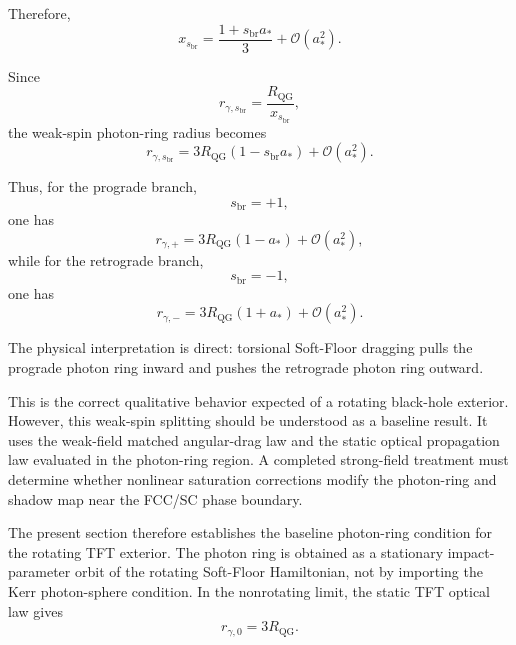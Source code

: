 Therefore,
\begin{equation}
    x_{s_{\mathrm{br}}} = \frac{1+s_{\mathrm{br}} a_\ast}{3} + \mathcal{O}(a_\ast^2).
\end{equation}

Since
\begin{equation}
    r_{\gamma,s_{\mathrm{br}}} = \frac{R_{\mathrm{QG}}}{x_{s_{\mathrm{br}}}},
\end{equation}
the weak-spin photon-ring radius becomes
\begin{equation}
    \boxed{ r_{\gamma,s_{\mathrm{br}}} = 3R_{\mathrm{QG}} \left( 1-s_{\mathrm{br}} a_\ast \right) + \mathcal{O}(a_\ast^2). }
\end{equation}

Thus, for the prograde branch,
\begin{equation}
    s_{\mathrm{br}} = +1,
\end{equation}
one has
\begin{equation}
    \boxed{ r_{\gamma,+} = 3R_{\mathrm{QG}} (1-a_\ast) + \mathcal{O}(a_\ast^2), }
\end{equation}
while for the retrograde branch,
\begin{equation}
    s_{\mathrm{br}} = -1,
\end{equation}
one has
\begin{equation}
    \boxed{ r_{\gamma,-} = 3R_{\mathrm{QG}} (1+a_\ast) + \mathcal{O}(a_\ast^2). }
\end{equation}

The physical interpretation is direct: torsional Soft-Floor dragging pulls the prograde photon ring inward and pushes the retrograde photon ring outward.

This is the correct qualitative behavior expected of a rotating black-hole exterior. However, this weak-spin splitting should be understood as a baseline result. It uses the weak-field matched angular-drag law and the static optical propagation law evaluated in the photon-ring region. A completed strong-field treatment must determine whether nonlinear saturation corrections modify the photon-ring and shadow map near the FCC/SC phase boundary.

The present section therefore establishes the baseline photon-ring condition for the rotating TFT exterior. The photon ring is obtained as a stationary impact-parameter orbit of the rotating Soft-Floor Hamiltonian, not by importing the Kerr photon-sphere condition. In the nonrotating limit, the static TFT optical law gives
\begin{equation}
    r_{\gamma,0} = 3R_{\mathrm{QG}}.
\end{equation}

